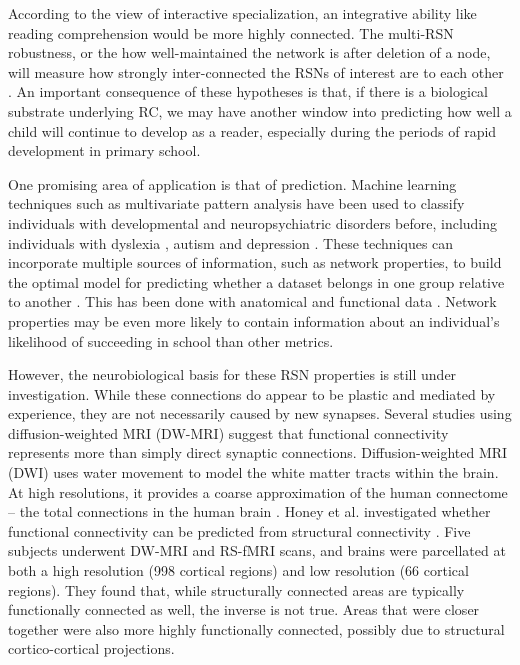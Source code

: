 According to the view of interactive specialization, an integrative ability like reading comprehension would be more highly connected. The multi-RSN robustness, or the how well-maintained the network is after deletion of a node, will measure how strongly inter-connected the RSNs of interest are to each other \cite{Bullmore2009}. An important consequence of these hypotheses is that, if there is a biological substrate underlying RC, we may have another window into predicting how well a child will continue to develop as a reader, especially during the periods of rapid development in primary school.

One promising area of application is that of prediction. Machine learning techniques such as multivariate pattern analysis have been used to classify individuals with developmental and neuropsychiatric disorders before, including individuals with dyslexia \cite{Ecker2010, Hoeft2011, Wee2014, Hoeft2007, Ingalhalikar2014}, autism and depression \cite{Lord2012}.  These techniques can incorporate multiple sources of information, such as network properties, to build the optimal model for predicting whether a dataset belongs in one group relative to another \cite{Pereira2009}. This has been done with anatomical and functional data \cite{Hoeft2007, Hoeft2007b}. Network properties may be even more likely to contain information about an individual's likelihood of succeeding in school than other metrics.

However, the neurobiological basis for these RSN properties is still under investigation. While these connections do appear to be plastic and mediated by experience, they are not necessarily caused by new synapses. Several studies using diffusion-weighted MRI (DW-MRI) suggest that functional connectivity represents more than simply direct synaptic connections. Diffusion-weighted MRI (DWI) uses water movement to model the white matter tracts within the brain. At high resolutions, it provides a coarse approximation of the human connectome -- the total connections in the human brain \cite{Sporns2005}. Honey et al. investigated whether functional connectivity can be predicted from structural connectivity \cite{Honey2009}. Five subjects underwent DW-MRI and RS-fMRI scans, and brains were parcellated at both a high resolution (998 cortical regions) and low resolution (66 cortical regions). They found that, while structurally connected areas are typically functionally connected as well, the inverse is not true. Areas that were closer together were also more highly functionally connected, possibly due to structural cortico-cortical projections. 

